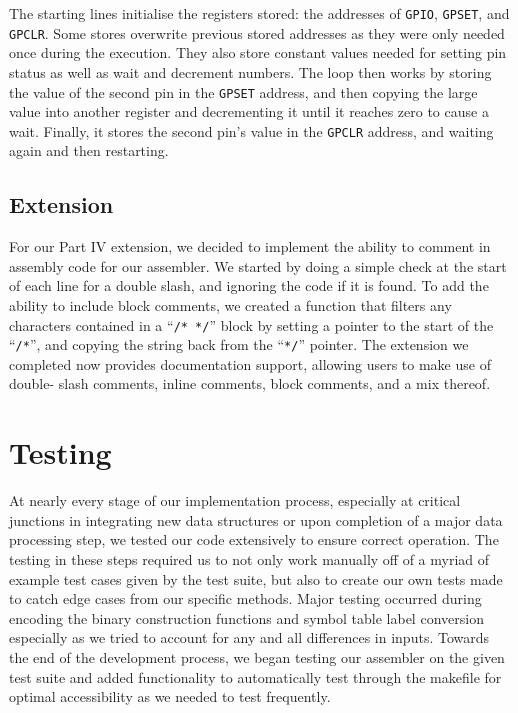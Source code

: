 \documentclass[11pt]{article}
\begin{document}
The starting lines initialise the registers stored: the addresses of \verb|GPIO|, \verb|GPSET|, 
and \verb|GPCLR|. Some stores overwrite previous stored addresses as they were only needed 
once during the execution. They also store constant values needed for setting pin status as 
well as wait and decrement numbers. The loop then works by storing the value of the second pin 
in the \verb|GPSET| address, and then copying the large value into another register and 
decrementing it until it reaches zero to cause a wait. Finally, it stores the second pin's 
value in the \verb|GPCLR| address, and waiting again and then restarting.

\subsection{Extension}

For our Part IV extension, we decided to implement the ability to comment in assembly code for 
our assembler. We started by doing a simple check at the start of each line for a double slash, 
and ignoring the code if it is found. To add the ability to include block comments, we created 
a function that filters any characters contained in a ``\verb|/* */|'' block by setting a pointer 
to the start of the ``\verb|/*|'', and copying the string back from the ``\verb|*/|'' pointer. The 
extension we completed now provides documentation support, allowing users to make use of double-
slash comments, inline comments, block comments, and a mix thereof.

\section{Testing}

At nearly every stage of our implementation process, especially at critical junctions in integrating 
new data structures or upon completion of a major data processing step, we tested our code 
extensively to ensure correct operation. The testing in these steps required us to not only 
work manually off of a myriad of example test cases given by the test suite, but also to create 
our own tests made to catch edge cases from our specific methods. Major testing occurred during 
encoding the binary construction functions and symbol table label conversion especially as we 
tried to account for any and all differences in inputs. Towards the end of the development 
process, we began testing our assembler on the given test suite and added functionality to 
automatically test through the makefile for optimal accessibility as we needed to test 
frequently.
\end{document}
